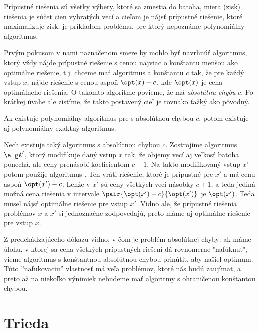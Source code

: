Prípustné riešenia sú všetky výbery, ktoré sa zmestia do batoha, miera (zisk)
riešenia je súčet cien vybratých vecí a cieľom je nájsť prípustné riešenie,
ktoré maximalizuje zisk. \knapsack je príkladom problému, pre ktorý nepoznáme
polynomiálny algoritmus. 

Prvým pokusom v nami naznačenom smere  by mohlo byť navrhnúť algoritmus, ktorý
vždy nájde prípustné riešenie s cenou najviac o konštantu menšou ako optimálne
riešenie, t.j. chceme mať algoritmus \algA a konštantu $c$ tak,
že pre každý vstup $x$, \algA nájde riešenie s cenou aspoň $\opt(x)-c$, kde
$\opt(x)$ je cena optimálneho riešenia. O takomto algoritme povieme, že má
{\em absolútnu chybu} $c$.
Po krátkej úvahe ale zistíme, že takto postavený cieľ je rovnako ťažký ako pôvodný.

\begin{veta}
  Ak existuje polynomiálny algoritmus pre \knapsack s absolútnou chybou $c$,
potom existuje aj polynomiálny exaktný algoritmus.  
\end{veta}

\begin{dokaz}
  Nech existuje taký algoritmus \algA s absolútnou chybou $c$. Zostrojíme
  algoritmus $\algA'$, ktorý modifikuje daný vstup $x$ tak, že objemy vecí aj
  veľkosť batoha ponechá, ale ceny prenásobí koeficientom $c+1$. Na takto
  modifikovaný vstup $x'$ potom použije algoritmus \algA.  Ten vráti riešenie,
  ktoré je prípustné pre $x'$ a má cenu aspoň $\opt(x')-c$. Lenže v $x'$ sú
  ceny všetkých vecí násobky $c+1$, a teda jediná možná cena riešenia v
  intervale $\pair{\opt(x')-c}{\opt(x')}$ je $\opt(x')$. Teda \algA musel nájsť
  optimálne riešenie pre vstup $x'$. Vidno ale, že prípustné riešenia problémov
  $x$ a $x'$ si jednoznačne zodpovedajú, preto máme aj optimálne riešenie pre
  vstup $x$.
\end{dokaz}

Z predchádzajúceho dôkazu vidno, v čom je problém absolútnej chyby: ak máme
úlohu, v ktorej sa cena všetkých prípustných riešení  dá rovnomerne "nafúknuť",
vieme algoritmus s konštantnou absolútnou chybou prinútiť, aby našiel optimum.
Túto ''nafukovaciu'' vlastnosť má veľa problémov, ktoré nás budú zaujímať, a
preto až na niekoľko výnimiek nebudeme mať algoritmy s ohraničenou konštantou
chybou. 

\section*{Trieda \APX}

